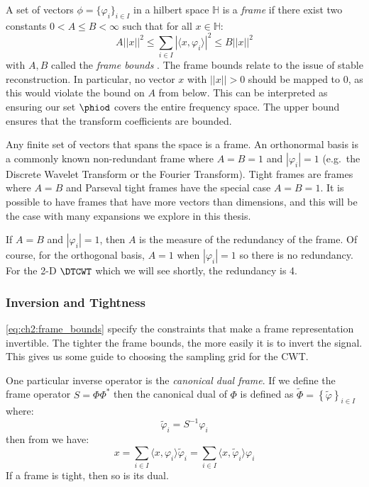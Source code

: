 A set of vectors $ \phi = \{ \varphi_i \}_{i \in I}$ in a hilbert space
$\mathbb{H}$ is a \emph{frame} if there exist two constants $0 < A\leq B <
\infty$ such that for all $x \in \mathbb{H}$:
\begin{equation}
  A||x||^2 \leq \sum_{i\in I} |\langle x, \varphi_i \rangle|^2 \leq B ||x||^2
  \label{eq:ch2:frame_bounds}
\end{equation}
with $A, B$ called the \emph{frame bounds} \cite{kovacevic_introduction_2008}.
The frame bounds relate to the issue of stable reconstruction. In particular, no
vector $x$ with $||x||>0$ should be mapped to 0, as this would violate the bound
on $A$ from below. This can be interpreted as ensuring our set $\phiod$ covers the
entire frequency space. The upper bound ensures that the transform
coefficients are bounded.

Any finite set of vectors that spans the space is a frame. An orthonormal basis
is a commonly known non-redundant frame where $A=B=1$ and $|\varphi_i|=1$ (e.g.\ the Discrete
Wavelet Transform or the Fourier Transform). Tight frames are frames where $A=B$
and Parseval tight frames have the special case $A=B=1$. It is possible to have
frames that have more vectors than dimensions, and this will be the case with
many expansions we explore in this thesis.

If $A=B$ and $|\varphi_i| = 1$, then $A$ is
the measure of the redundancy of the frame. Of course, for the orthogonal basis,
$A=1$ when $|\varphi_i|=1$ so there is no redundancy. For the 2-D $\DTCWT$ which we
will see shortly, the redundancy is 4.

\subsubsection{Inversion and Tightness}
\eqref{eq:ch2:frame_bounds} specify the constraints that make a frame
representation invertible.
The tighter the frame bounds, the more easily it is to invert the signal.
This gives us some guide to choosing the sampling grid for the CWT.

One particular inverse operator is the \emph{canonical dual frame}.
If we define the frame operator $S = \Phi\Phi^*$ then the canonical dual
of $\Phi$ is defined as $\tilde{\Phi} = \left\{ \tilde{\varphi}\right\}_{i \in I}$
where:
\begin{equation}
  \tilde{\varphi}_i = S^{-1}\varphi_i
\end{equation}
then from \cite{kovacevic_introduction_2008} we have:
\begin{equation}
  x = \sum_{i\in I} \langle x, \varphi_i \rangle \tilde{\varphi}_i = \sum_{i\in I}
  \langle x, \tilde{\varphi}_i \rangle \varphi_i
\end{equation}
If a frame is tight, then so is its dual.

